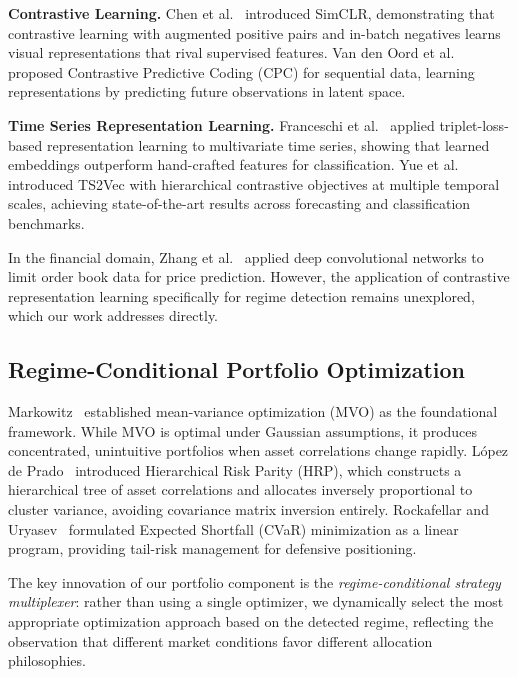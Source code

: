 \documentclass[conference, twocolumn]{IEEEtran}
\begin{document}
\textbf{Contrastive Learning.} Chen et al.~\cite{chen2020} introduced SimCLR, demonstrating that contrastive learning with augmented positive pairs and in-batch negatives learns visual representations that rival supervised features. Van den Oord et al.~\cite{oord2018} proposed Contrastive Predictive Coding (CPC) for sequential data, learning representations by predicting future observations in latent space.

\textbf{Time Series Representation Learning.} Franceschi et al.~\cite{franceschi2019} applied triplet-loss-based representation learning to multivariate time series, showing that learned embeddings outperform hand-crafted features for classification. Yue et al.~\cite{yue2022} introduced TS2Vec with hierarchical contrastive objectives at multiple temporal scales, achieving state-of-the-art results across forecasting and classification benchmarks.

In the financial domain, Zhang et al.~\cite{zhang2019} applied deep convolutional networks to limit order book data for price prediction. However, the application of contrastive representation learning specifically for regime detection remains unexplored, which our work addresses directly.

\subsection{Regime-Conditional Portfolio Optimization}

Markowitz~\cite{markowitz1952} established mean-variance optimization (MVO) as the foundational framework. While MVO is optimal under Gaussian assumptions, it produces concentrated, unintuitive portfolios when asset correlations change rapidly. L\'opez de Prado~\cite{lopez2016} introduced Hierarchical Risk Parity (HRP), which constructs a hierarchical tree of asset correlations and allocates inversely proportional to cluster variance, avoiding covariance matrix inversion entirely. Rockafellar and Uryasev~\cite{rockafellar2000} formulated Expected Shortfall (CVaR) minimization as a linear program, providing tail-risk management for defensive positioning.

The key innovation of our portfolio component is the \textit{regime-conditional strategy multiplexer}: rather than using a single optimizer, we dynamically select the most appropriate optimization approach based on the detected regime, reflecting the observation that different market conditions favor different allocation philosophies.
\end{document}
